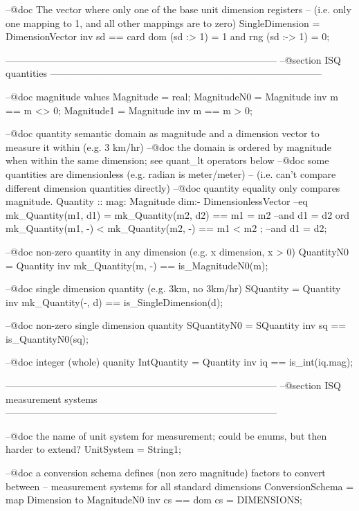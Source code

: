\documentclass[a4paper]{article}
\begin{document}
\begin{vdm_al}
 --@doc The vector where only one of the base unit dimension registers 
 --    (i.e. only one mapping to 1, and all other mappings are to zero)
 SingleDimension = DimensionVector
 inv sd == card dom (sd :> {1}) = 1 and rng (sd :-> {1}) = {0};
  
------------------------------------------------------------------------------------
--@section ISQ quantities
------------------------------------------------------------------------------------
    
  --@doc magnitude values 
 Magnitude   = real;
 MagnitudeN0 = Magnitude inv m == m <> 0;
 Magnitude1  = Magnitude inv m == m > 0;

 --@doc quantity semantic domain as magnitude and a dimension vector to measure it within (e.g. 3 km/hr)
 --@doc the domain is ordered by magnitude when within the same dimension; see quant_lt operators below 
 --@doc some quantities are dimensionless (e.g. radian is meter/meter)
 --   (i.e. can't compare different dimension quantities directly)
 --@doc quantity equality only compares magnitude.  
 Quantity ::
  mag: Magnitude
  dim:- DimensionlessVector
 --eq  mk_Quantity(m1, d1) = mk_Quantity(m2, d2) == m1 = m2 --and d1 = d2
 ord mk_Quantity(m1, -) < mk_Quantity(m2, -) == m1 < m2 ; --and d1 = d2;
        
 --@doc non-zero quantity in any dimension (e.g. x dimension, x > 0)
 QuantityN0 = Quantity
 inv mk_Quantity(m, -) == is_MagnitudeN0(m);

 --@doc single dimension quantity (e.g. 3km, no 3km/hr)
 SQuantity = Quantity
 inv mk_Quantity(-, d) == is_SingleDimension(d);

 --@doc non-zero single dimension quantity
 SQuantityN0 = SQuantity
 inv sq == is_QuantityN0(sq);
        
 --@doc integer (whole) quanity
 IntQuantity = Quantity
 inv iq == is_int(iq.mag);
            
------------------------------------------------------------------------------------
--@section ISQ measurement systems
------------------------------------------------------------------------------------

 --@doc the name of unit system for measurement; could be enums, but then harder to extend?
 UnitSystem = String1;
        
 --@doc a conversion schema defines (non zero magnitude) factors to convert between 
 --    measurement systems for all standard dimensions
 ConversionSchema = map Dimension to MagnitudeN0
 inv cs == dom cs = DIMENSIONS;
        

\end{vdm_al}
\end{document}
